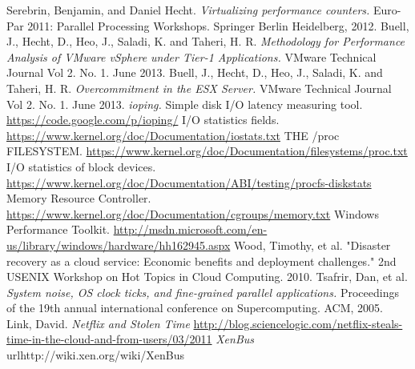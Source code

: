 \begin{thebibliography}{9}
Serebrin, Benjamin, and Daniel Hecht.  \emph{Virtualizing performance counters.}  Euro-Par 2011: Parallel Processing Workshops. Springer Berlin Heidelberg, 2012.
Buell, J., Hecht, D., Heo, J., Saladi, K. and Taheri, H. R.  \emph{Methodology for Performance Analysis of VMware vSphere under Tier-1 Applications.}  VMware Technical Journal Vol 2. No. 1.  June 2013.
Buell, J., Hecht, D., Heo, J., Saladi, K. and Taheri, H. R.  \emph{Overcommitment in the ESX Server.}  VMware Technical Journal Vol 2. No. 1.  June 2013.
\emph{ioping.}  Simple disk I/O latency measuring tool.  \url{https://code.google.com/p/ioping/}
 I/O statistics fields. \url{https://www.kernel.org/doc/Documentation/iostats.txt}
 THE /proc FILESYSTEM. \url{https://www.kernel.org/doc/Documentation/filesystems/proc.txt}
 I/O statistics of block devices. \url{https://www.kernel.org/doc/Documentation/ABI/testing/procfs-diskstats}
 Memory Resource Controller. \url{https://www.kernel.org/doc/Documentation/cgroups/memory.txt}
 Windows Performance Toolkit. \url{http://msdn.microsoft.com/en-us/library/windows/hardware/hh162945.aspx}
 Wood, Timothy, et al. "Disaster recovery as a cloud service: Economic benefits and deployment challenges." 2nd USENIX Workshop on Hot Topics in Cloud Computing. 2010.
 Tsafrir, Dan, et al. \emph{System noise, OS clock ticks, and fine-grained parallel applications.} Proceedings of the 19th annual international conference on Supercomputing. ACM, 2005.
 Link, David.  \emph{Netflix and Stolen Time} \url{http://blog.sciencelogic.com/netflix-steals-time-in-the-cloud-and-from-users/03/2011} 
 \emph{XenBus} url{http://wiki.xen.org/wiki/XenBus}
\end{thebibliography}

